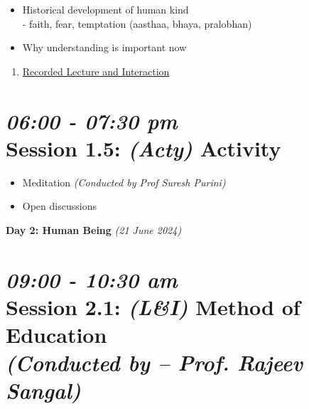 \documentclass[11pt]{article}
\begin{document}
    \begin{itemize}
        \item Historical development of human kind \\
        - faith, fear, temptation (aasthaa, bhaya, pralobhan)
        \item Why understanding is important now
    \end{itemize}

    \begin{enumerate}
        \item \href{https://www.youtube.com/watch?v=q0fQkHFS46c}{Recorded Lecture and Interaction}
    \end{enumerate}

    \section*{{\it 06:00 - 07:30 pm} \\
    Session 1.5: {\it (Acty)} Activity}

    \begin{itemize}
        \item Meditation {\em (Conducted by Prof Suresh Purini)}
        \item Open discussions
    \end{itemize}


    \begin{center}
        \vspace{10mm}
        {\LARGE {\bf Day 2: Human Being} {\em (21 June 2024)} }\\
    \end{center}


    \section*{{\it 09:00 - 10:30 am} \\
    Session 2.1: {\it (L\&I)} {\bf Method of Education} \\
    {\Large\it (Conducted by -- Prof. Rajeev Sangal)}}
\end{document}
